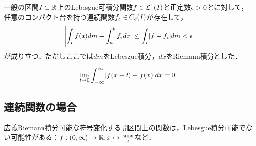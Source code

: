 \documentclass[uplatex, dvipdfmx]{jsreport}
\begin{document}
\begin{theorem}
    一般の区間$I\subset\mathbb{R}$上のLebesgue可積分関数$f\in\mathcal{L}^1(I)$と正定数$\epsilon>0$とに対して，任意のコンパクト台を持つ連続関数$f_\epsilon\in C_c(I)$が存在して，
    \[\left|\int_If(x)dm-\int^b_af_\epsilon dx\right|\le\int_I\lvert f-f_\epsilon\rvert dm<\epsilon\]
    が成り立つ．ただしここでは$dm$をLebesgue積分，$dx$をRiemann積分とした．
\end{theorem}

\begin{corollary}
    \[\lim_{t\to0}\int^\infty_{-\infty}\lvert f(x+t)-f(x)\rvert dx=0.\]
\end{corollary}

\subsection{連続関数の場合}

\begin{tcolorbox}[colframe=ForestGreen, colback=ForestGreen!10!white,breakable,colbacktitle=ForestGreen!40!white,coltitle=black,fonttitle=\bfseries\sffamily,
title=]
    広義Riemann積分可能な符号変化する開区間上の関数は，Lebesgue積分可能でない可能性がある：$f:(0,\infty)\to\mathbb{R};x\mapsto\frac{\sin x}{x}$など．
\end{tcolorbox}
\end{document}
